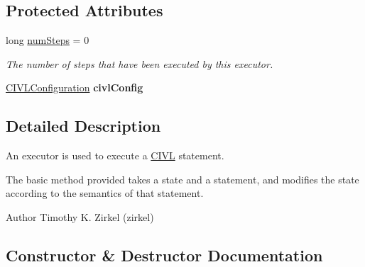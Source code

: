 \subsection*{Protected Attributes}
\begin{DoxyCompactItemize}
\item 
long \hyperlink{classedu_1_1udel_1_1cis_1_1vsl_1_1civl_1_1semantics_1_1common_1_1CommonExecutor_aa0612bd3c7b03dbd293fe5fce2acf721}{num\+Steps} = 0
\begin{DoxyCompactList}\small\item\em The number of steps that have been executed by this executor. \end{DoxyCompactList}\item 
\hypertarget{classedu_1_1udel_1_1cis_1_1vsl_1_1civl_1_1semantics_1_1common_1_1CommonExecutor_a485b3de4daa0d9d5a39d93b9aa5f335e}{}\hyperlink{classedu_1_1udel_1_1cis_1_1vsl_1_1civl_1_1config_1_1IF_1_1CIVLConfiguration}{C\+I\+V\+L\+Configuration} {\bfseries civl\+Config}\label{classedu_1_1udel_1_1cis_1_1vsl_1_1civl_1_1semantics_1_1common_1_1CommonExecutor_a485b3de4daa0d9d5a39d93b9aa5f335e}

\end{DoxyCompactItemize}


\subsection{Detailed Description}
An executor is used to execute a \hyperlink{classedu_1_1udel_1_1cis_1_1vsl_1_1civl_1_1CIVL}{C\+I\+V\+L} statement. 

The basic method provided takes a state and a statement, and modifies the state according to the semantics of that statement.

\begin{DoxyAuthor}{Author}
Timothy K. Zirkel (zirkel) 
\end{DoxyAuthor}


\subsection{Constructor \& Destructor Documentation}
\hypertarget{classedu_1_1udel_1_1cis_1_1vsl_1_1civl_1_1semantics_1_1common_1_1CommonExecutor_a34966eeb8c5174397f7c93686c7a4aaf}{}
